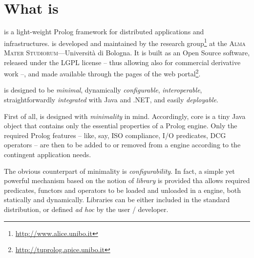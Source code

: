 \chapter{What is \tuprolog{}}
\label{what-is}

\tuprolog{} is a light-weight Prolog framework for distributed applications and infrastructures.
%
\tuprolog{} is developed and maintained by the \alice{} research group\footnote{\url{http://www.alice.unibo.it}} at the \textsc{Alma Mater Studiorum}---Universit\`{a} di Bologna.
%
It is built as an Open Source software, released under the LGPL license -- thus allowing also for commercial derivative work --, and made available through the pages of the \apice{} web portal\footnote{\url{http://tuprolog.apice.unibo.it}}.

\tuprolog{} is designed to be \emph{minimal}, dynamically \emph{configurable}, \emph{interoperable}, straightforwardly \emph{integrated} with Java and .NET, and easily \emph{deployable}.

First of all, \tuprolog{} is designed with \textit{minimality} in mind.
%
Accordingly, \tuprolog{} core is a tiny Java object that contains only the essential properties of a Prolog engine.
%
Only the required Prolog features -- like, say, ISO compliance, I/O predicates, DCG operators -- are then to be added to or removed from a \tuprolog{} engine according to the contingent application needs.

The obvious counterpart of minimality is \tuprolog{} \textit{configurability}.
%
In fact, a simple yet powerful mechanism based on the notion of \tuprolog{} \textit{library} is provided tha allows required predicates, functors and operators to be loaded and unloaded in a \tuprolog{} engine, both statically and dynamically.
%
Libraries can be either included in the standard \tuprolog{} distribution, or defined \textit{ad hoc} by the \tuprolog{} user / developer. 

